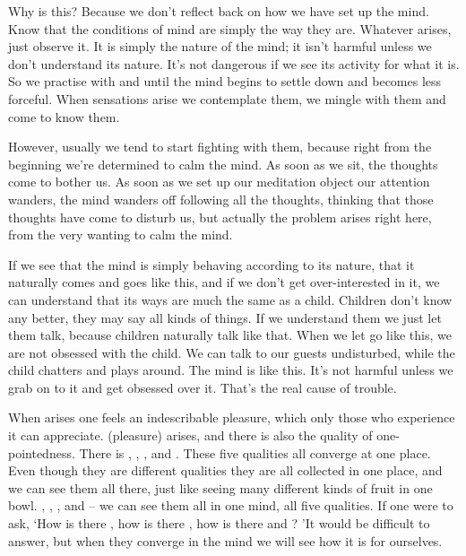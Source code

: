Why is this? Because we don't reflect back on how we have set up the mind. Know that the conditions of mind are simply the way they are. Whatever arises, just observe it. It is simply the nature of the mind; it isn't harmful unless we don't understand its nature. It's not dangerous if we see its activity for what it is. So we practise with  and  until the mind begins to settle down and becomes less forceful. When sensations arise we contemplate them, we mingle with them and come to know them. 

However, usually we tend to start fighting with them, because right from the beginning we're determined to calm the mind. As soon as we sit, the thoughts come to bother us. As soon as we set up our meditation object our attention wanders, the mind wanders off following all the thoughts, thinking that those thoughts have come to disturb us, but actually the problem arises right here, from the very wanting to calm the mind. 

If we see that the mind is simply behaving according to its nature, that it naturally comes and goes like this, and if we don't get over-interested in it, we can understand that its ways are much the same as a child. Children don't know any better, they may say all kinds of things. If we understand them we just let them talk, because children naturally talk like that. When we let go like this, we are not obsessed with the child. We can talk to our guests undisturbed, while the child chatters and plays around. The mind is like this. It's not harmful unless we grab on to it and get obsessed over it. That's the real cause of trouble. 

When  arises one feels an indescribable pleasure, which only those who experience it can appreciate.  (pleasure) arises, and there is also the quality of one-pointedness. There is , , ,  and . These five qualities all converge at one place. Even though they are different qualities they are all collected in one place, and we can see them all there, just like seeing many different kinds of fruit in one bowl. , , ,  and  -- we can see them all in one mind, all five qualities. If one were to ask, `How is there , how is there , how is there  and ? 'It would be difficult to answer, but when they converge in the mind we will see how it is for ourselves. 

